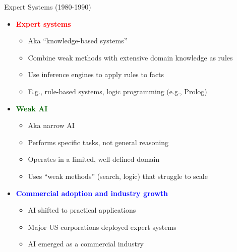 \documentclass[
  10pt,
  ignorenonframetext,
]{beamer}
\providecommand{\tightlist}{%
  \setlength{\itemsep}{0pt}\setlength{\parskip}{0pt}}
\begin{document}
\begin{frame}{Expert Systems (1980-1990)}
\label{expert-systems-1980-1990}
\begin{itemize}
\tightlist
\item
  \textbf{\textcolor{red}{Expert systems}}

  \begin{itemize}
  \tightlist
  \item
    Aka ``knowledge-based systems''
  \item
    Combine weak methods with extensive domain knowledge as rules
  \item
    Use inference engines to apply rules to facts
  \item
    E.g., rule-based systems, logic programming (e.g., Prolog)
  \end{itemize}
\item
  \textbf{\textcolor{darkgreen}{Weak AI}}

  \begin{itemize}
  \tightlist
  \item
    Aka narrow AI
  \item
    Performs specific tasks, not general reasoning
  \item
    Operates in a limited, well-defined domain
  \item
    Uses ``weak methods'' (search, logic) that struggle to scale
  \end{itemize}
\item
  \textbf{\textcolor{blue}{Commercial adoption and industry growth}}

  \begin{itemize}
  \tightlist
  \item
    AI shifted to practical applications
  \item
    Major US corporations deployed expert systems
  \item
    AI emerged as a commercial industry
  \end{itemize}
\end{itemize}
\end{frame}
\end{document}
